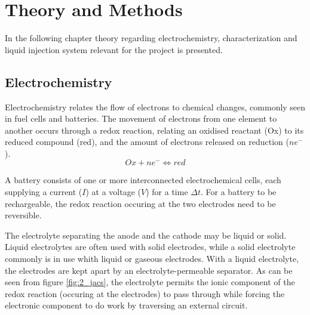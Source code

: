 \documentclass[Main/main.tex]{subfiles}
\begin{document}
\chapter{Theory and Methods}


In the following chapter theory regarding electrochemistry, characterization and liquid injection system relevant for the project is presented. 

\section{Electrochemistry}
Electrochemistry relates the flow of electrons to chemical changes, commonly seen in fuel cells and batteries. The movement of electrons from one element to another occurs through a redox reaction, relating an oxidised reactant (Ox) to its reduced compound (red), and the amount of electrons released on reduction ($ne^-$).
$$ Ox + ne^- \iff red $$


A battery consists of one or more interconnected electrochemical cells, each supplying a current ($I$) at a voltage ($V$) for a time $\Delta t$. For a battery to be rechargeable, the redox reaction occuring at the two electrodes need to be reversible.

The electrolyte separating the anode and the cathode may be liquid or solid. Liquid electrolytes are often used with solid electrodes, while a solid electrolyte commonly is in use whith liquid or gaseous electrodes. With a liquid electrolyte, the electrodes are kept apart by an electrolyte-permeable separator. As can be seen from figure \ref{fig:2_jacs}, the electrolyte permits the ionic component of the redox reaction (occuring at the electrodes) to pass through while forcing the electronic component to do work by traversing an external circuit. 
\end{document}
